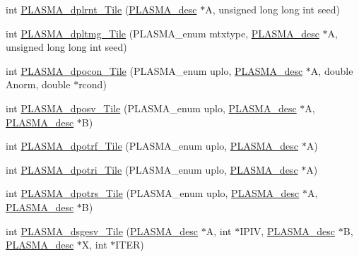 \begin{DoxyCompactItemize}
\item 
int \hyperlink{group__double__Tile_ga33b8a1269c462c06d73620b4f786a565_ga33b8a1269c462c06d73620b4f786a565}{P\+L\+A\+S\+M\+A\+\_\+dplrnt\+\_\+\+Tile} (\hyperlink{structplasma__desc__t}{P\+L\+A\+S\+M\+A\+\_\+desc} $\ast$A, unsigned long long int seed)
\item 
int \hyperlink{group__double__Tile_ga97608884deb6e29227508196a72a9b0a_ga97608884deb6e29227508196a72a9b0a}{P\+L\+A\+S\+M\+A\+\_\+dpltmg\+\_\+\+Tile} (P\+L\+A\+S\+M\+A\+\_\+enum mtxtype, \hyperlink{structplasma__desc__t}{P\+L\+A\+S\+M\+A\+\_\+desc} $\ast$A, unsigned long long int seed)
\item 
int \hyperlink{group__double__Tile_ga66c7ac129ac344419cbda9d34493061a_ga66c7ac129ac344419cbda9d34493061a}{P\+L\+A\+S\+M\+A\+\_\+dpocon\+\_\+\+Tile} (P\+L\+A\+S\+M\+A\+\_\+enum uplo, \hyperlink{structplasma__desc__t}{P\+L\+A\+S\+M\+A\+\_\+desc} $\ast$A, double Anorm, double $\ast$rcond)
\item 
int \hyperlink{group__double__Tile_gafbd4f95d401f8ef6ff4dc0ad57853657_gafbd4f95d401f8ef6ff4dc0ad57853657}{P\+L\+A\+S\+M\+A\+\_\+dposv\+\_\+\+Tile} (P\+L\+A\+S\+M\+A\+\_\+enum uplo, \hyperlink{structplasma__desc__t}{P\+L\+A\+S\+M\+A\+\_\+desc} $\ast$A, \hyperlink{structplasma__desc__t}{P\+L\+A\+S\+M\+A\+\_\+desc} $\ast$B)
\item 
int \hyperlink{group__double__Tile_ga6fde33d873bc6ad52b7c0c63ccc669ab_ga6fde33d873bc6ad52b7c0c63ccc669ab}{P\+L\+A\+S\+M\+A\+\_\+dpotrf\+\_\+\+Tile} (P\+L\+A\+S\+M\+A\+\_\+enum uplo, \hyperlink{structplasma__desc__t}{P\+L\+A\+S\+M\+A\+\_\+desc} $\ast$A)
\item 
int \hyperlink{group__double__Tile_gab78b1dc223af4cceea99502e98e9fb72_gab78b1dc223af4cceea99502e98e9fb72}{P\+L\+A\+S\+M\+A\+\_\+dpotri\+\_\+\+Tile} (P\+L\+A\+S\+M\+A\+\_\+enum uplo, \hyperlink{structplasma__desc__t}{P\+L\+A\+S\+M\+A\+\_\+desc} $\ast$A)
\item 
int \hyperlink{group__double__Tile_ga07a5a6b08e66c1a66da7845f99a86a21_ga07a5a6b08e66c1a66da7845f99a86a21}{P\+L\+A\+S\+M\+A\+\_\+dpotrs\+\_\+\+Tile} (P\+L\+A\+S\+M\+A\+\_\+enum uplo, \hyperlink{structplasma__desc__t}{P\+L\+A\+S\+M\+A\+\_\+desc} $\ast$A, \hyperlink{structplasma__desc__t}{P\+L\+A\+S\+M\+A\+\_\+desc} $\ast$B)
\item 
int \hyperlink{group__double__Tile_ga355c69a3889aa359f924f1477b10462a_ga355c69a3889aa359f924f1477b10462a}{P\+L\+A\+S\+M\+A\+\_\+dsgesv\+\_\+\+Tile} (\hyperlink{structplasma__desc__t}{P\+L\+A\+S\+M\+A\+\_\+desc} $\ast$A, int $\ast$I\+P\+I\+V, \hyperlink{structplasma__desc__t}{P\+L\+A\+S\+M\+A\+\_\+desc} $\ast$B, \hyperlink{structplasma__desc__t}{P\+L\+A\+S\+M\+A\+\_\+desc} $\ast$X, int $\ast$I\+T\+E\+R)

\end{DoxyCompactItemize}
